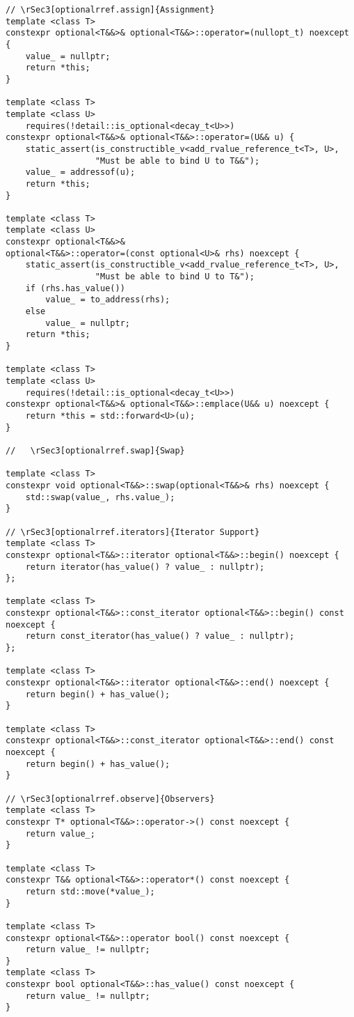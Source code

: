 \documentclass[a4paper,10pt,oneside,openany,final,article]{memoir}
\begin{document}
\begin{verbatim}
// \rSec3[optionalrref.assign]{Assignment}
template <class T>
constexpr optional<T&&>& optional<T&&>::operator=(nullopt_t) noexcept {
    value_ = nullptr;
    return *this;
}

template <class T>
template <class U>
    requires(!detail::is_optional<decay_t<U>>)
constexpr optional<T&&>& optional<T&&>::operator=(U&& u) {
    static_assert(is_constructible_v<add_rvalue_reference_t<T>, U>,
                  "Must be able to bind U to T&&");
    value_ = addressof(u);
    return *this;
}

template <class T>
template <class U>
constexpr optional<T&&>&
optional<T&&>::operator=(const optional<U>& rhs) noexcept {
    static_assert(is_constructible_v<add_rvalue_reference_t<T>, U>,
                  "Must be able to bind U to T&");
    if (rhs.has_value())
        value_ = to_address(rhs);
    else
        value_ = nullptr;
    return *this;
}

template <class T>
template <class U>
    requires(!detail::is_optional<decay_t<U>>)
constexpr optional<T&&>& optional<T&&>::emplace(U&& u) noexcept {
    return *this = std::forward<U>(u);
}

//   \rSec3[optionalrref.swap]{Swap}

template <class T>
constexpr void optional<T&&>::swap(optional<T&&>& rhs) noexcept {
    std::swap(value_, rhs.value_);
}

// \rSec3[optionalrref.iterators]{Iterator Support}
template <class T>
constexpr optional<T&&>::iterator optional<T&&>::begin() noexcept {
    return iterator(has_value() ? value_ : nullptr);
};

template <class T>
constexpr optional<T&&>::const_iterator optional<T&&>::begin() const noexcept {
    return const_iterator(has_value() ? value_ : nullptr);
};

template <class T>
constexpr optional<T&&>::iterator optional<T&&>::end() noexcept {
    return begin() + has_value();
}

template <class T>
constexpr optional<T&&>::const_iterator optional<T&&>::end() const noexcept {
    return begin() + has_value();
}

// \rSec3[optionalrref.observe]{Observers}
template <class T>
constexpr T* optional<T&&>::operator->() const noexcept {
    return value_;
}

template <class T>
constexpr T&& optional<T&&>::operator*() const noexcept {
    return std::move(*value_);
}

template <class T>
constexpr optional<T&&>::operator bool() const noexcept {
    return value_ != nullptr;
}
template <class T>
constexpr bool optional<T&&>::has_value() const noexcept {
    return value_ != nullptr;
}


\end{verbatim}
\end{document}
